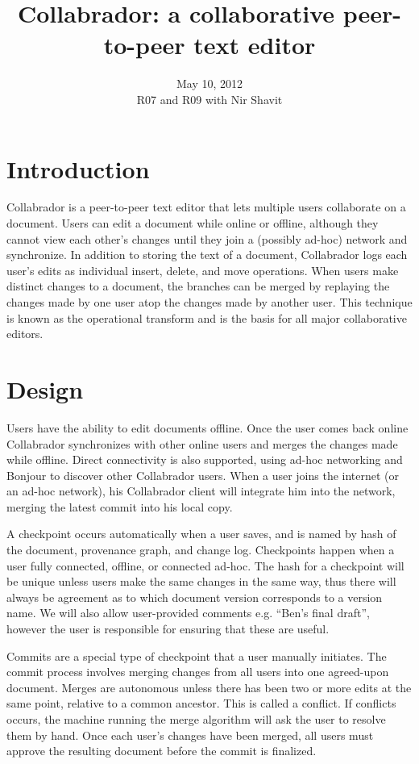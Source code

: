 \documentclass[11pt,titlepage]{article}
\title{Collabrador: a collaborative peer-to-peer text editor}
\author{
  \name{Jacob Hurwitz}{jhurwitz@mit.edu}
  \name{Colleen Josephson}{cjoseph@mit.edu}
  \name{David Lawrence}{dlaw@mit.edu}}
\date{
  May 10, 2012 \\ \small
  R07 and R09 with Nir Shavit}
\begin{document}
\maketitle

\section{Introduction}

Collabrador is a peer-to-peer text editor that lets multiple users
collaborate on a document. Users can edit a document while online or
offline, although they cannot view each other's changes until they
join a (possibly ad-hoc) network and synchronize.  In addition to
storing the text of a document, Collabrador logs each user's edits as
individual insert, delete, and move operations.  When users make
distinct changes to a document, the branches can be merged by
replaying the changes made by one user atop the changes made by
another user.  This technique is known as the operational transform
and is the basis for all major collaborative editors.

\section{Design}

Users have the ability to edit documents offline. Once the user comes
back online Collabrador synchronizes with other online users and
merges the changes made while offline. Direct connectivity is also
supported, using ad-hoc networking and Bonjour to discover other
Collabrador users. When a user joins the internet (or an ad-hoc
network), his Collabrador client will integrate him into the network,
merging the latest commit into his local copy.

A checkpoint occurs automatically when a user saves, and is named by
hash of the document, provenance graph, and change log. Checkpoints
happen when a user fully connected, offline, or connected ad-hoc. The
hash for a checkpoint will be unique unless users make the same
changes in the same way, thus there will always be agreement as to
which document version corresponds to a version name. We will also
allow user-provided comments e.g. ``Ben's final draft'', however the
user is responsible for ensuring that these are useful.

Commits are a special type of checkpoint that a user manually
initiates. The commit process involves merging changes from all users
into one agreed-upon document. Merges are autonomous unless there has
been two or more edits at the same point, relative to a common
ancestor. This is called a conflict. If conflicts occurs, the machine
running the merge algorithm will ask the user to resolve them by
hand. Once each user's changes have been merged, all users must
approve the resulting document before the commit is finalized.
\end{document}
